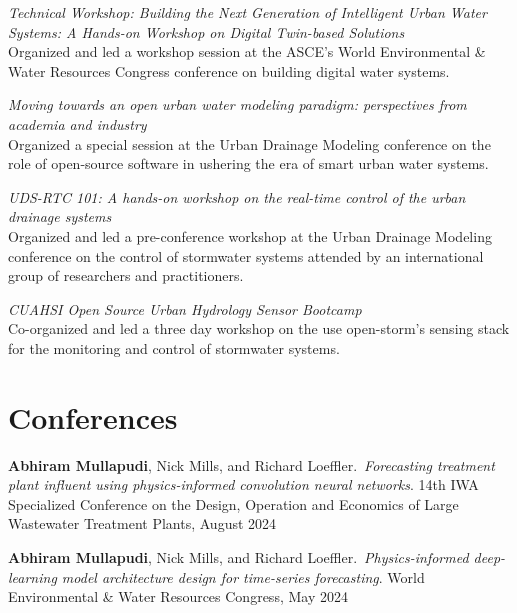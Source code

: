 \documentclass[a4paper,11pt]{article}
\newcommand{\years}[1]{%
  {\reversemarginpar\strut\marginnote{{\small#1}}}%
}
\begin{document}
\years{2023} \emph{Technical Workshop: Building the Next Generation of Intelligent Urban Water
Systems: A Hands-on Workshop on Digital Twin-based Solutions}\\[0.2cm]
Organized and led a workshop session at the ASCE’s World Environmental \& Water Resources Congress conference on building
digital water systems.\\[.1cm]

\years{2022} \emph{Moving towards an open urban water modeling paradigm: perspectives from academia and industry}\\[.2cm]
Organized a special session at the Urban Drainage Modeling conference on the
role of open-source software in ushering the era of smart urban water systems.\\[.1cm]

\years{2022} \emph{UDS-RTC 101: A hands-on workshop on the real-time control of the urban drainage systems}\\[.2cm]
Organized and led a pre-conference workshop at the Urban Drainage Modeling
conference on the control of stormwater systems attended by an international
group of researchers and practitioners.\\[.1cm]

\years{2017, 2019} \emph{CUAHSI Open Source Urban Hydrology Sensor Bootcamp}\\[.2cm]
Co-organized and led a three day workshop on the use open-storm’s sensing stack
for the monitoring and control of stormwater systems.

\section*{Conferences}

\years{2024} \textbf{Abhiram Mullapudi}, Nick Mills, and Richard Loeffler.\ \emph{Forecasting treatment plant influent using physics-informed convolution neural networks}. 14th IWA Specialized Conference on the Design, Operation and Economics of Large Wastewater Treatment Plants, August 2024\\[.1cm]

\years{2024} \textbf{Abhiram Mullapudi}, Nick Mills, and Richard Loeffler.\ \emph{Physics-informed deep-learning model architecture design for time-series forecasting}.  World Environmental \& Water Resources Congress, May 2024\\[.1cm]
\end{document}
